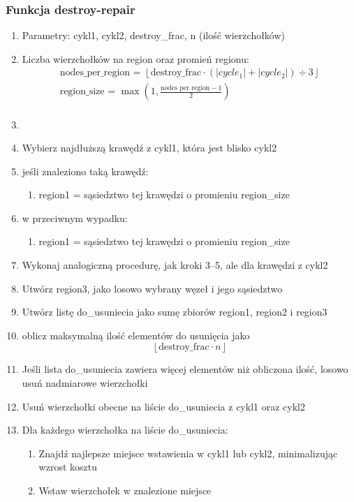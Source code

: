 \documentclass[11pt]{article}
\begin{document}
\subsubsection{Funkcja destroy-repair}
\begin{enumerate}
    \item Parametry: cykl1, cykl2, destroy\_frac, n (ilość wierzchołków)
    \item Liczba wierzchołków na region oraz promień regionu:
    \begin{gather*}
        \text{nodes\_per\_region = }  \left\lfloor \text{destroy\_frac} \cdot (|cycle_1| + |cycle_2|) \div 3 \right\rfloor\\
        \text{region\_size = } \max\left(1, \frac{\text{nodes per region} - 1}{2} \right)\\
    \end{gather*}

    \item

    \item  Wybierz najdłuższą krawędź z cykl1, która jest blisko cykl2
    \item jeśli znaleziono taką krawędź:
    \begin{enumerate}
        \item region1 = sąsiedztwo tej krawędzi o promieniu region\_size
    \end{enumerate}
    \item w przeciwnym wypadku:
    \begin{enumerate}
        \item region1 = sąsiedztwo tej krawędzi o promieniu region\_size
    \end{enumerate}
    \item Wykonaj analogiczną procedurę, jak kroki 3--5, ale dla krawędzi z cykl2
    \item Utwórz region3, jako losowo wybrany węzeł i jego sąsiedztwo
    \item Utwórz listę do\_usuniecia jako sumę zbiorów region1, region2 i region3
    \item oblicz maksymalną ilość elementów do usunięcia jako \[\left\lfloor \text{destroy\_frac} \cdot n\right\rfloor\]
    \item Jeśli lista do\_usuniecia zawiera więcej elementów niż obliczona ilość, losowo usuń nadmiarowe wierzchołki
    \item Usuń wierzchołki obecne na liście do\_usuniecia z cykl1 oraz cykl2
    \item Dla każdego wierzchołka na liście do\_usuniecia:
    \begin{enumerate}
        \item Znajdź najlepsze miejsce wstawienia w cykl1 lub cykl2, minimalizując wzrost kosztu
        \item Wstaw wierzchołek w znalezione miejsce
    \end{enumerate}

\end{enumerate}
\end{document}
